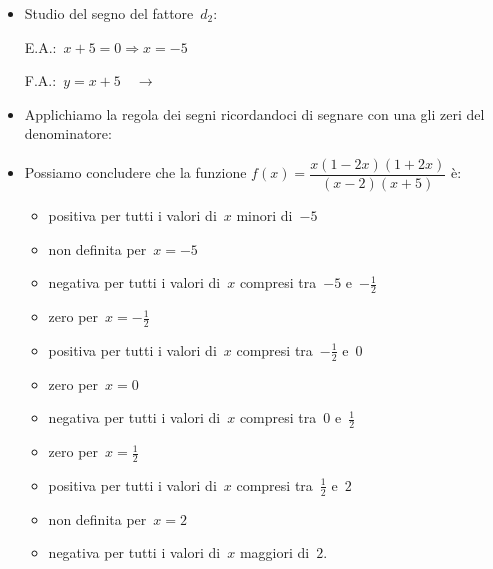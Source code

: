 \begin{esempio}
\begin{itemize} [noitemsep]
 \begin{minipage}{.45\textwidth}
  E.A.:~\(x-2=0 \Rightarrow x=2\)
 \end{minipage}
 \begin{minipage}{.25\textwidth}
  F.A.:~\(y=x-2 \quad \rightarrow\)
 \end{minipage}
 \begin{minipage}{.3\textwidth}
%   
 \end{minipage}
 \item Studio del segno del fattore~\(d_2\):\\
 \begin{minipage}{.45\textwidth}
  E.A.:~\(x+5=0 \Rightarrow x=-5\)
 \end{minipage}
 \begin{minipage}{.25\textwidth}
  F.A.:~\(y=x+5 \quad \rightarrow\)
 \end{minipage}
 \begin{minipage}{.3\textwidth}
%   
 \end{minipage}
 \item Applichiamo la regola dei segni ricordandoci di segnare con una 
  gli zeri del denominatore:

  \segnomista
 \item Possiamo concludere che la funzione
 \(f(x)=\dfrac{x(1 -2 x)(1 + 2 x)}{(x -2)(x +5)}\) è:
\begin{itemize} [noitemsep]
 \item positiva per tutti i valori di~\(x\) minori di~\(-5\)
 \item non definita per~\(x=-5\)
 \item negativa per tutti i valori di~\(x\) compresi tra~\(-5\) e~\(-\frac{1}{2}\)
 \item zero per~\(x=-\frac{1}{2}\)
 \item positiva per tutti i valori di~\(x\) compresi tra~\(-\frac{1}{2}\) e~\(0\)
 \item zero per~\(x=0\)
 \item negativa per tutti i valori di~\(x\) compresi tra~\(0\) e~\(\frac{1}{2}\)
 \item zero per~\(x=\frac{1}{2}\)
 \item positiva per tutti i valori di~\(x\) compresi tra~\(\frac{1}{2}\) e~\(2\)
 \item non definita per~\(x=2\)
 \item negativa per tutti i valori di~\(x\) maggiori di~\(2\).
\end{itemize}
\end{itemize}
 \end{esempio}

